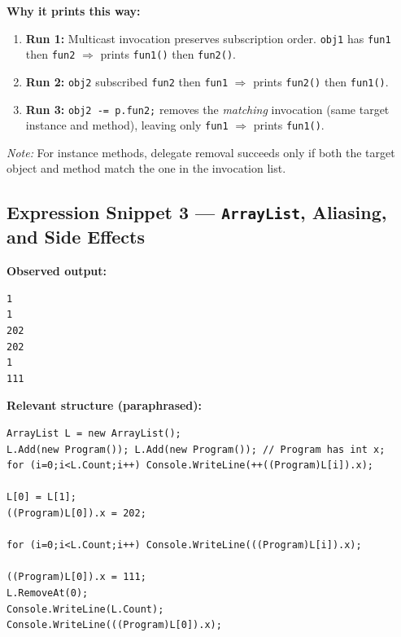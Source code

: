 \textbf{Why it prints this way:}
\begin{enumerate}
  \item \textbf{Run 1:} Multicast invocation preserves subscription order. \verb|obj1| has \verb|fun1| then \verb|fun2| \(\Rightarrow\) prints \verb|fun1()| then \verb|fun2()|.
  \item \textbf{Run 2:} \verb|obj2| subscribed \verb|fun2| then \verb|fun1| \(\Rightarrow\) prints \verb|fun2()| then \verb|fun1()|.
  \item \textbf{Run 3:} \verb|obj2 -= p.fun2;| removes the \emph{matching} invocation (same target instance and method), leaving only \verb|fun1| \(\Rightarrow\) prints \verb|fun1()|.
\end{enumerate}
\textit{Note:} For instance methods, delegate removal succeeds only if both the target object and method match the one in the invocation list.

\subsection*{Expression Snippet 3 — \texttt{ArrayList}, Aliasing, and Side Effects}
\textbf{Observed output:}
\begin{verbatim}
1
1
202
202
1
111
\end{verbatim}

\textbf{Relevant structure (paraphrased):}
\begin{verbatim}
ArrayList L = new ArrayList();
L.Add(new Program()); L.Add(new Program()); // Program has int x;
for (i=0;i<L.Count;i++) Console.WriteLine(++((Program)L[i]).x);

L[0] = L[1];
((Program)L[0]).x = 202;

for (i=0;i<L.Count;i++) Console.WriteLine(((Program)L[i]).x);

((Program)L[0]).x = 111;
L.RemoveAt(0);
Console.WriteLine(L.Count);
Console.WriteLine(((Program)L[0]).x);
\end{verbatim}

